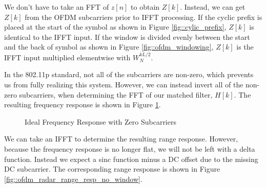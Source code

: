 \documentclass[conference]{IEEEtran}
\begin{document}
		We don't have to take an FFT of $z[n]$ to obtain $Z[k]$. Instead, we can get $Z[k]$ from the OFDM subcarriers prior to IFFT processing. If the cyclic prefix is placed at the start of the symbol as shown in Figure \ref{fig::cylic_prefix}, $Z[k]$ is identical to the IFFT input. If the window is divided evenly between the start and the back of symbol as shown in Figure \ref{fig::ofdm_windowing}, $Z[k]$ is the IFFT input multiplied elementwise with $W_N^{kL/2}$.
		
		In the 802.11p standard, not all of the subcarriers are non-zero, which prevents us from fully realizing this system. However, we can instead invert all of the non-zero subcarriers, when determining the FFT of our matched filter, $H[k]$. The resulting frequency response is shown in Figure \ref{fig::ofdm_radar_freq_resp_no_window}.
		
		\begin{figure}[H]
			\centering
    			\caption{Ideal Frequency Response with Zero Subcarriers}
    			\label{fig::ofdm_radar_freq_resp_no_window}
  	  	\end{figure}
		
		We can take an IFFT to determine the resulting range response. However, because the frequency response is no longer flat, we will not be left with a delta function. Instead we expect a sinc function minus a DC offset due to the missing DC subcarrier. The corresponding range response is shown in Figure \ref{fig::ofdm_radar_range_resp_no_window}.
		
\end{document}
